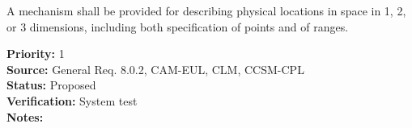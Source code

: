 

A mechanism shall be provided for describing physical locations in space in 1,
2, or 3 dimensions, including both specification of points and of ranges.
\begin{reqlist}
{\bf Priority:} 1 \\
{\bf Source:} General Req. 8.0.2, CAM-EUL, CLM, CCSM-CPL \\
{\bf Status:} Proposed \\
{\bf Verification:} System test\\
{\bf Notes:} 
\end{reqlist}

